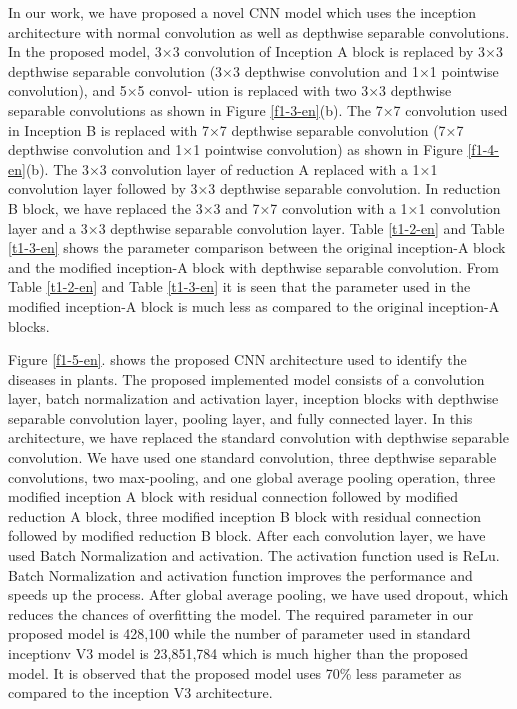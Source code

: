 In our work, we have proposed a novel CNN model which uses the inception architecture with normal convolution as well as depthwise separable convolutions. In the proposed model, 3×3 convolution of Inception A block is replaced by 3×3 depthwise separable convolution (3×3 depthwise convolution and 1×1 pointwise convolution), and 5×5 convol- ution is replaced with two 3×3 depthwise separable convolutions as shown in Figure \ref{f1-3-en}(b). The 7×7 convolution used in Inception B is replaced with 7×7 depthwise separable convolution (7×7 depthwise convolution and 1×1 pointwise convolution) as shown in Figure \ref{f1-4-en}(b). The 3×3 convolution layer of reduction A replaced with a 1×1 convolution layer followed by 3×3 depthwise separable convolution. In reduction B block, we have replaced the 3×3 and 7×7 convolution with a 1×1 convolution layer and a 3×3 depthwise separable convolution layer. Table \ref{t1-2-en} and Table \ref{t1-3-en} shows the parameter comparison between the original inception-A block and the modified inception-A block with depthwise separable convolution. From Table \ref{t1-2-en} and Table \ref{t1-3-en} it is seen that the parameter used in the modified inception-A block is much less as compared to the original inception-A blocks.



Figure \ref{f1-5-en}. shows the proposed CNN architecture used to identify the diseases in plants. The proposed implemented model consists of a convolution layer, batch normalization and activation layer, inception blocks with depthwise separable convolution layer, pooling layer, and fully connected layer. In this architecture, we have replaced the standard convolution with depthwise separable convolution. We have used one standard convolution, three depthwise separable convolutions, two max-pooling, and one global average pooling operation, three modified inception A block with residual connection followed by modified reduction A block, three modified inception B block with residual connection followed by modified reduction B block. After each convolution layer, we have used Batch Normalization and activation. The activation function used is ReLu. Batch Normalization and activation function improves the performance and speeds up the process. After global average pooling, we have used dropout, which reduces the chances of overfitting the model. The required parameter in our proposed model is 428,100 while the number of parameter used in standard inceptionv V3 model is 23,851,784 which is much higher than the proposed model. It is observed that the proposed model uses 70\% less parameter as compared to the inception V3 architecture.

